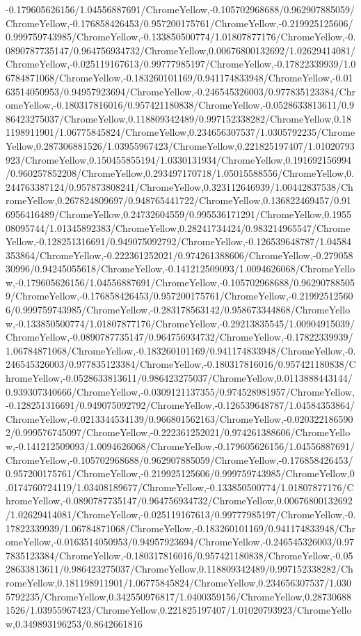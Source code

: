 {\begin{tikzternal}
{-0.179605626156/1.04556887691/ChromeYellow,-0.105702968688/0.962907885059/ChromeYellow,-0.176858426453/0.957200175761/ChromeYellow,-0.219925125606/0.999759743985/ChromeYellow,-0.133850500774/1.01807877176/ChromeYellow,-0.0890787735147/0.964756934732/ChromeYellow,0.00676800132692/1.02629414081/ChromeYellow,-0.025119167613/0.99777985197/ChromeYellow,-0.17822339939/1.06784871068/ChromeYellow,-0.183260101169/0.941174833948/ChromeYellow,-0.0163514050953/0.94957923694/ChromeYellow,-0.246545326003/0.977835123384/ChromeYellow,-0.180317816016/0.957421180838/ChromeYellow,-0.0528633813611/0.986423275037/ChromeYellow,0.118809342489/0.997152338282/ChromeYellow,0.181198911901/1.06775845824/ChromeYellow,0.234656307537/1.0305792235/ChromeYellow,0.287306881526/1.03955967423/ChromeYellow,0.221825197407/1.01020793923/ChromeYellow,0.150455855194/1.0330131934/ChromeYellow,0.191692156994/0.960257852208/ChromeYellow,0.293497170718/1.05015588556/ChromeYellow,0.244763387124/0.957873808241/ChromeYellow,0.323112646939/1.00442837538/ChromeYellow,0.267824809697/0.948765441722/ChromeYellow,0.136822469457/0.916956416489/ChromeYellow,0.24732604559/0.995536171291/ChromeYellow,0.195508095744/1.01345892383/ChromeYellow,0.28241734424/0.983214965547/ChromeYellow,-0.128251316691/0.949075092792/ChromeYellow,-0.126539648787/1.04584353864/ChromeYellow,-0.222361252021/0.974261388606/ChromeYellow,-0.27905830996/0.94245055618/ChromeYellow,-0.141212509093/1.0094626068/ChromeYellow,-0.179605626156/1.04556887691/ChromeYellow,-0.105702968688/0.962907885059/ChromeYellow,-0.176858426453/0.957200175761/ChromeYellow,-0.219925125606/0.999759743985/ChromeYellow,-0.283178563142/0.958673344868/ChromeYellow,-0.133850500774/1.01807877176/ChromeYellow,-0.29213835545/1.00904915039/ChromeYellow,-0.0890787735147/0.964756934732/ChromeYellow,-0.17822339939/1.06784871068/ChromeYellow,-0.183260101169/0.941174833948/ChromeYellow,-0.246545326003/0.977835123384/ChromeYellow,-0.180317816016/0.957421180838/ChromeYellow,-0.0528633813611/0.986423275037/ChromeYellow,0.0113888443144/0.939307340666/ChromeYellow,-0.0309121137355/0.974528981957/ChromeYellow,-0.128251316691/0.949075092792/ChromeYellow,-0.126539648787/1.04584353864/ChromeYellow,-0.0213344534139/0.966801562163/ChromeYellow,-0.0203221865902/0.999576745097/ChromeYellow,-0.222361252021/0.974261388606/ChromeYellow,-0.141212509093/1.0094626068/ChromeYellow,-0.179605626156/1.04556887691/ChromeYellow,-0.105702968688/0.962907885059/ChromeYellow,-0.176858426453/0.957200175761/ChromeYellow,-0.219925125606/0.999759743985/ChromeYellow,0.0174760724119/1.03408189677/ChromeYellow,-0.133850500774/1.01807877176/ChromeYellow,-0.0890787735147/0.964756934732/ChromeYellow,0.00676800132692/1.02629414081/ChromeYellow,-0.025119167613/0.99777985197/ChromeYellow,-0.17822339939/1.06784871068/ChromeYellow,-0.183260101169/0.941174833948/ChromeYellow,-0.0163514050953/0.94957923694/ChromeYellow,-0.246545326003/0.977835123384/ChromeYellow,-0.180317816016/0.957421180838/ChromeYellow,-0.0528633813611/0.986423275037/ChromeYellow,0.118809342489/0.997152338282/ChromeYellow,0.181198911901/1.06775845824/ChromeYellow,0.234656307537/1.0305792235/ChromeYellow,0.342550976817/1.0400359156/ChromeYellow,0.287306881526/1.03955967423/ChromeYellow,0.221825197407/1.01020793923/ChromeYellow,0.349893196253/0.8642661816}
\end{tikzternal}}
